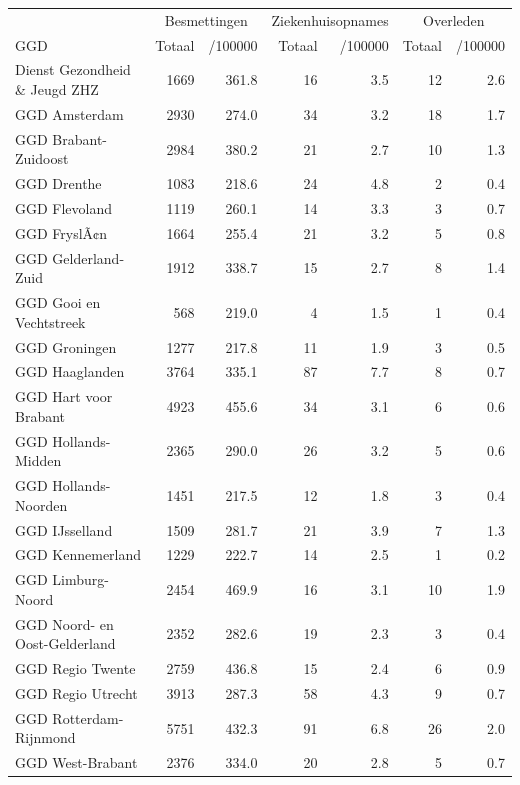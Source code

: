 \documentclass[
  english,
  man,floatsintext]{apa6}
\begin{document}
\begin{table}
\centering\begingroup\fontsize{10}{12}\selectfont

\begin{threeparttable}
\begin{tabular}{lrrrrrr}
\toprule
\multicolumn{1}{c}{ } & \multicolumn{2}{c}{Besmettingen} & \multicolumn{2}{c}{Ziekenhuisopnames} & \multicolumn{2}{c}{Overleden} \\
\cmidrule(l{3pt}r{3pt}){2-3} \cmidrule(l{3pt}r{3pt}){4-5} \cmidrule(l{3pt}r{3pt}){6-7}
GGD & Totaal & /100000 & Totaal & /100000 & Totaal & /100000\\
\midrule
Dienst Gezondheid \& Jeugd ZHZ & 1669 & 361.8 & 16 & 3.5 & 12 & 2.6\\
GGD Amsterdam & 2930 & 274.0 & 34 & 3.2 & 18 & 1.7\\
GGD Brabant-Zuidoost & 2984 & 380.2 & 21 & 2.7 & 10 & 1.3\\
GGD Drenthe & 1083 & 218.6 & 24 & 4.8 & 2 & 0.4\\
GGD Flevoland & 1119 & 260.1 & 14 & 3.3 & 3 & 0.7\\
GGD FryslÃ¢n & 1664 & 255.4 & 21 & 3.2 & 5 & 0.8\\
GGD Gelderland-Zuid & 1912 & 338.7 & 15 & 2.7 & 8 & 1.4\\
GGD Gooi en Vechtstreek & 568 & 219.0 & 4 & 1.5 & 1 & 0.4\\
GGD Groningen & 1277 & 217.8 & 11 & 1.9 & 3 & 0.5\\
GGD Haaglanden & 3764 & 335.1 & 87 & 7.7 & 8 & 0.7\\
GGD Hart voor Brabant & 4923 & 455.6 & 34 & 3.1 & 6 & 0.6\\
GGD Hollands-Midden & 2365 & 290.0 & 26 & 3.2 & 5 & 0.6\\
GGD Hollands-Noorden & 1451 & 217.5 & 12 & 1.8 & 3 & 0.4\\
GGD IJsselland & 1509 & 281.7 & 21 & 3.9 & 7 & 1.3\\
GGD Kennemerland & 1229 & 222.7 & 14 & 2.5 & 1 & 0.2\\
GGD Limburg-Noord & 2454 & 469.9 & 16 & 3.1 & 10 & 1.9\\
GGD Noord- en Oost-Gelderland & 2352 & 282.6 & 19 & 2.3 & 3 & 0.4\\
GGD Regio Twente & 2759 & 436.8 & 15 & 2.4 & 6 & 0.9\\
GGD Regio Utrecht & 3913 & 287.3 & 58 & 4.3 & 9 & 0.7\\
GGD Rotterdam-Rijnmond & 5751 & 432.3 & 91 & 6.8 & 26 & 2.0\\
GGD West-Brabant & 2376 & 334.0 & 20 & 2.8 & 5 & 0.7\\

\end{tabular}
\end{threeparttable}
\end{table}
\end{document}

